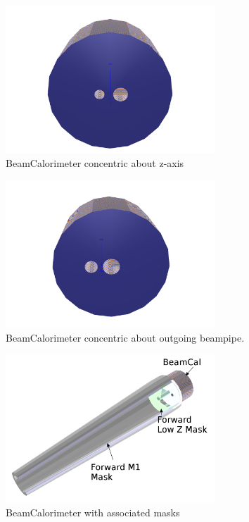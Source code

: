 \documentclass{report}
\begin{document}
            \begin{figure}[h] 
                \includegraphics[width=0.7\textwidth]{beamcal_zaxis}
                \centering
                \caption{BeamCalorimeter concentric about z-axis}
                \label{beamcal_zaxis}
            \end{figure}
            \begin{figure}[H] 
                \includegraphics[width=0.7\textwidth]{beamcal_aligned}
                \centering
                \caption{BeamCalorimeter concentric about outgoing beampipe.}
                \label{beamcal_aligned}
            \end{figure}
            \begin{figure}[H] 
                \includegraphics[width=0.7\textwidth]{beamcal_masks}
                \centering
                \caption{BeamCalorimeter with associated masks}
                \label{beamcal_masks}
            \end{figure}
\end{document}
